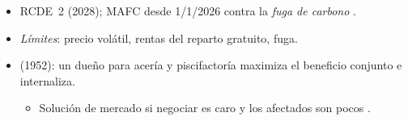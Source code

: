 \documentclass{article}
\begin{document}
\begin{columnas}
\begin{itemize}
\begin{itemize}
  \item RCDE~2 (2028); MAFC desde 1/1/2026 contra la \emph{fuga de carbono} .
  \item \emph{Límites}: precio volátil, rentas del reparto gratuito, fuga.
  \end{itemize}
\end{itemize}
\begin{itemize}
\item {} (1952): un dueño para acería y piscifactoría maximiza el beneficio conjunto e internaliza.
  \begin{itemize}
  \item Solución de mercado si negociar es caro y los afectados son pocos .
  \end{itemize}
\end{itemize}


\end{columnas}
\end{document}
